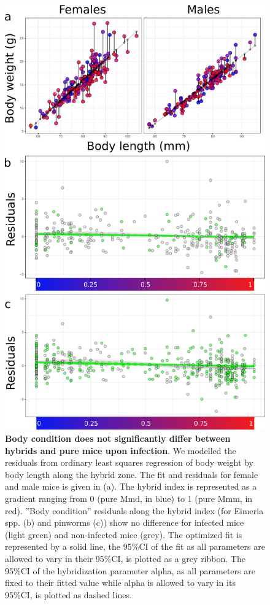 \begin{figure}[H]
    \centering
    \includegraphics[width=0.75\linewidth,height=\textheight,keepaspectratio]{images/2article1/Figure4.pdf}
    \caption{\textbf{Body condition does not significantly differ between hybrids and pure mice upon infection}. We modelled the residuals from ordinary least squares regression of body weight by body length along the hybrid zone. The fit and residuals for female and male mice is given in (a). The hybrid index is represented as a gradient ranging from 0 (pure Mmd, in blue) to 1 (pure Mmm, in red). ”Body condition” residuals along the hybrid index (for Eimeria spp. (b) and pinworms (c)) show no difference for infected mice (light green) and non-infected mice (grey). The optimized fit is represented by a solid line, the 95\%CI of the fit as all parameters are allowed to vary in their 95\%CI, is plotted as a grey ribbon. The 95\%CI of the hybridization parameter alpha, as all parameters are fixed to their fitted value while alpha is allowed to vary in its 95\%CI, is plotted as dashed lines.}
\end{figure}

